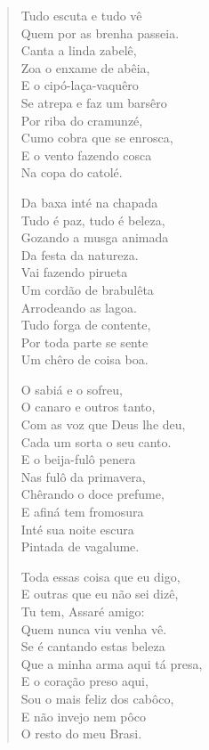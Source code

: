 \begin{verse}
Tudo escuta e tudo vê\\
Quem por as brenha passeia.\\
Canta a linda zabelê,\\
Zoa o enxame de abêia,\\
E o cipó-laça-vaquêro\\
Se atrepa e faz um barsêro\\
Por riba do cramunzé,\\
Cumo cobra que se enrosca,\\
E o vento fazendo cosca\\
Na copa do catolé.

Da baxa inté na chapada\\
Tudo é paz, tudo é beleza,\\
Gozando a musga animada\\
Da festa da natureza.\\
Vai fazendo pirueta\\
Um cordão de brabulêta\\
Arrodeando as lagoa.\\
Tudo forga de contente,\\
Por toda parte se sente\\
Um chêro de coisa boa.

O sabiá e o sofreu,\\
O canaro e outros tanto,\\
Com as voz que Deus lhe deu,\\
Cada um sorta o seu canto.\\
E o beija-fulô penera\\
Nas fulô da primavera,\\
Chêrando o doce prefume,\\
E afiná tem fromosura\\
Inté sua noite escura\\
Pintada de vagalume.

Toda essas coisa que eu digo,\\
E outras que eu não sei dizê,\\
Tu tem, Assaré amigo:\\
Quem nunca viu venha vê.\\
Se é cantando estas beleza\\
Que a minha arma aqui tá presa,\\
E o coração preso aqui,\\
Sou o mais feliz dos cabôco,\\
E não invejo nem pôco\\
O resto do meu Brasi.


\end{verse}
